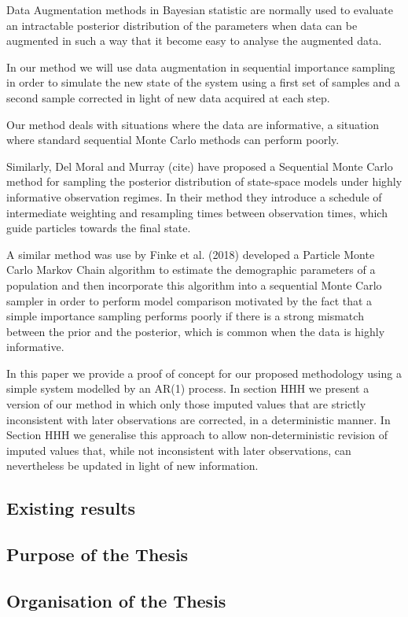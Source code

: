 Data Augmentation methods in Bayesian statistic are normally used to evaluate an intractable posterior distribution of the parameters when data can be augmented in such a way that it become easy to analyse the augmented data. \cite{Tanner}

In our method we will use data augmentation in sequential importance sampling in order to simulate the new state of the system using a first set of samples and a second sample corrected in light of new data acquired at each step.

Our method deals with situations where the data are informative, a situation where standard sequential Monte Carlo methods can perform poorly. 

Similarly, Del Moral and Murray (cite) have proposed a Sequential Monte Carlo method for sampling the posterior distribution of state-space models under highly informative observation regimes. In their method they introduce a schedule of intermediate weighting and resampling times between observation times, which guide particles towards the final state.

A similar method was use by Finke et al. (2018) developed a Particle Monte Carlo Markov Chain algorithm to estimate the demographic parameters of a population and then incorporate this algorithm into a sequential Monte Carlo sampler in order to perform model comparison motivated by the fact that a simple importance sampling performs poorly if there is a strong mismatch between the prior and the posterior, which is common when the data is highly informative.


In this paper we provide a proof of concept for our proposed methodology using a simple system modelled by an AR(1) process. In section HHH we present a version of our method in which only those imputed values that are strictly inconsistent with later observations are corrected, in a deterministic manner. In Section HHH we generalise this approach to allow non-deterministic revision of imputed values that, while not inconsistent with later observations, can nevertheless be updated in light of new information.

\subsection{Existing results}

\subsection{Purpose of the Thesis}

\subsection{Organisation of the Thesis}
